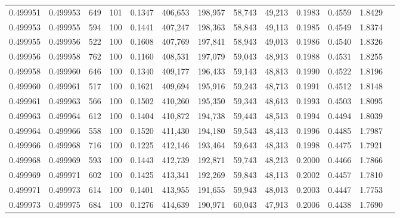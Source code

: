\begin{tabular}{rrrrrrrrrrrrr}
0.499951 & 0.499953 &   649 & 101 &                                     0.1347 & 406,653 & 198,957 &  58,743 &  49,213 & 0.1983 & 0.4559 & 1.8429 \\
0.499953 & 0.499955 &   594 & 100 &                                     0.1441 & 407,247 & 198,363 &  58,843 &  49,113 & 0.1985 & 0.4549 & 1.8374 \\
0.499955 & 0.499956 &   522 & 100 &                                     0.1608 & 407,769 & 197,841 &  58,943 &  49,013 & 0.1986 & 0.4540 & 1.8326 \\
0.499956 & 0.499958 &   762 & 100 &                                     0.1160 & 408,531 & 197,079 &  59,043 &  48,913 & 0.1988 & 0.4531 & 1.8255 \\
0.499958 & 0.499960 &   646 & 100 &                                     0.1340 & 409,177 & 196,433 &  59,143 &  48,813 & 0.1990 & 0.4522 & 1.8196 \\
0.499960 & 0.499961 &   517 & 100 &                                     0.1621 & 409,694 & 195,916 &  59,243 &  48,713 & 0.1991 & 0.4512 & 1.8148 \\
0.499961 & 0.499963 &   566 & 100 &                                     0.1502 & 410,260 & 195,350 &  59,343 &  48,613 & 0.1993 & 0.4503 & 1.8095 \\
0.499963 & 0.499964 &   612 & 100 &                                     0.1404 & 410,872 & 194,738 &  59,443 &  48,513 & 0.1994 & 0.4494 & 1.8039 \\
0.499964 & 0.499966 &   558 & 100 &                                     0.1520 & 411,430 & 194,180 &  59,543 &  48,413 & 0.1996 & 0.4485 & 1.7987 \\
0.499966 & 0.499968 &   716 & 100 &                                     0.1225 & 412,146 & 193,464 &  59,643 &  48,313 & 0.1998 & 0.4475 & 1.7921 \\
0.499968 & 0.499969 &   593 & 100 &                                     0.1443 & 412,739 & 192,871 &  59,743 &  48,213 & 0.2000 & 0.4466 & 1.7866 \\
0.499969 & 0.499971 &   602 & 100 &                                     0.1425 & 413,341 & 192,269 &  59,843 &  48,113 & 0.2002 & 0.4457 & 1.7810 \\
0.499971 & 0.499973 &   614 & 100 &                                     0.1401 & 413,955 & 191,655 &  59,943 &  48,013 & 0.2003 & 0.4447 & 1.7753 \\
0.499973 & 0.499975 &   684 & 100 &                                     0.1276 & 414,639 & 190,971 &  60,043 &  47,913 & 0.2006 & 0.4438 & 1.7690 \\

\end{tabular}
